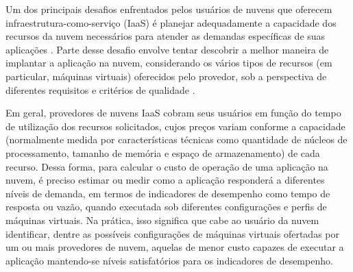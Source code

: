 \documentclass[10pt,conference,compsocconf]{IEEEtran}
\begin{document}

Um dos principais desafios enfrentados pelos usuários de nuvens que oferecem infraestrutura-como-serviço (IaaS) é planejar adequadamente a capacidade dos recursos da nuvem necessários para atender as demandas específicas de suas aplicações \cite{Menasce2009}.  Parte desse desafio envolve tentar descobrir a melhor maneira de implantar a aplicação na nuvem, considerando os vários tipos de recursos (em particular, máquinas virtuais) oferecidos pelo provedor, sob a perspectiva de diferentes requisitos e critérios de qualidade \cite{GoncalvesJunior2015}.  

Em geral, provedores de nuvens IaaS cobram seus usuários em função do tempo de utilização dos recursos solicitados, cujos preços variam conforme a capacidade (normalmente medida por características técnicas como quantidade de núcleos de processamento, tamanho de memória e espaço de armazenamento) de cada recurso. Dessa forma, para calcular o custo de operação de uma aplicação na nuvem, é preciso estimar ou medir como a aplicação responderá a diferentes níveis de demanda, em termos de indicadores de desempenho como tempo de resposta ou vazão, quando executada sob diferentes configurações e perfis de máquinas virtuais. Na prática, isso significa que cabe ao usuário da nuvem identificar, dentre as possíveis configurações de máquinas virtuais ofertadas por um ou mais provedores de nuvem, aquelas de menor custo capazes de executar a aplicação mantendo-se níveis satisfatórios para os indicadores de desempenho.


\end{document}
